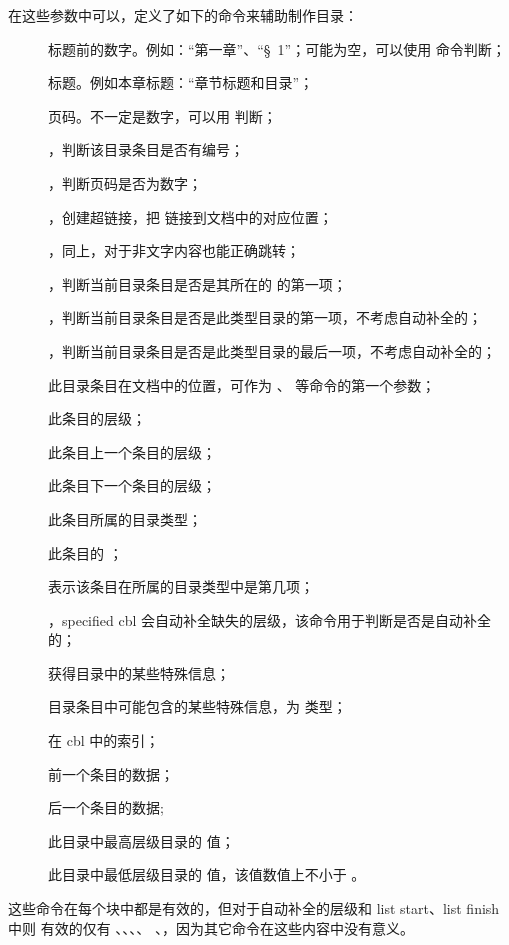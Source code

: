 \documentclass{cusdoc}
\begin{document}
在这些参数中可以，定义了如下的命令来辅助制作目录：
\begin{description}
  \item[\cmd\tocthename] 标题前的数字。例如：“第一章”、“\S~1”；可能为空，可以使用 \cmd{\tocifnamed} 命令判断；
  \item[\cmd\tocthetitle] 标题。例如本章标题：“章节标题和目录”；
  \item[\cmd\tocthepage] 页码。不一定是数字，可以用 \cmd{\tocifpageisnumber} 判断；
  \item[\cmd\tocifnamed]，判断该目录条目是否有编号；
  \item[\cmd\tocifpageisnumber]，判断页码是否为数字；
  \item[\cmd\toclink]，创建超链接，把  链接到文档中的对应位置；
  \item[\cmd\toclinkbox]，同上，对于非文字内容也能正确跳转；
  \item[\cmd\tociffirst]，判断当前目录条目是否是其所在的  的第一项；
  \item[\cmd\tocifheadentry]，判断当前目录条目是否是此类型目录的第一项，不考虑自动补全的；
  \item[\cmd\tociftailentry]，判断当前目录条目是否是此类型目录的最后一项，不考虑自动补全的；
  \item[\cmd\toctheanchor] 此目录条目在文档中的位置，可作为 、 等命令的第一个参数；
  \item[\cmd\tocthelevel] 此条目的层级；
  \item[\cmd\toctheprevlevel] 此条目上一个条目的层级；
  \item[\cmd\tocthenextlevel] 此条目下一个条目的层级；
  \item[\cmd\tocthetype] 此条目所属的目录类型；
  \item[\cmd\toctheclass] 此条目的 ；
  \item[\cmd\toctheindex] 表示该条目在所属的目录类型中是第几项；
  \item[\cmd\tocifcomplement]，specified cbl 会自动补全缺失的层级，该命令用于判断是否是自动补全的；
  \item[\cmd\tocretinfo] 获得目录中的某些特殊信息；
  \item[\cmd\toctheinfo] 目录条目中可能包含的某些特殊信息，为  类型；
  \item[\cmd\tocthecount] 在 cbl 中的索引；
  \item[\cmd\tocthepreventry] 前一个条目的数据；
  \item[\cmd\tocthenextentry] 后一个条目的数据;
  \item[\cmd\tochilevel] 此目录中最高层级目录的  值；
  \item[\cmd\toclolevel] 此目录中最低层级目录的  值，该值数值上不小于 。
\end{description}
这些命令在每个块中都是有效的，但对于自动补全的层级和 list start、list finish 中则
有效的仅有 \cmd\tocthelevel、\cmd\toctheclass、\cmd\tocifcomplement、\cmd\tocthetype、
\cmd\tochilevel、\cmd\toclolevel，因为其它命令在这些内容中没有意义。
\end{document}
